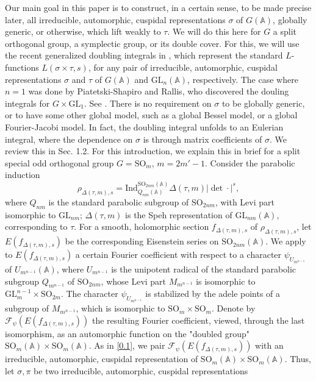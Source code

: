 \documentclass[12pts]{amsart}
\newcommand{\BA}{{\mathbb {A}}}
\newcommand{\GL}{{\mathrm{GL}}}
\newcommand{\Ind}{{\mathrm{Ind}}}
\newcommand{\SO}{{\mathrm{SO}}}
\begin{document}
Our main goal in this paper is to construct, in a certain sense, to be made precise later, all irreducible, automorphic, cuspidal representations $\sigma$ of $G(\BA)$, globally generic, or otherwise, which lift weakly to $\tau$. We will do this here for $G$ a split orthogonal group, a symplectic group, or its double cover. For this, we will use the recent generalized doubling integrals in \cite{CFGK17}, which represent the standard $L$-functions $L(\sigma\times\tau,s)$, for any pair of irreducible, automorphic, cuspidal representations $\sigma$ and $\tau$ of $G(\BA)$ and $\GL_n(\BA)$, respectively. The case where $n=1$ was done by Piatetski-Shapiro and Rallis, who discovered the douling integrals for $G\times \GL_1$. See \cite{PSR87}. There is no requirement on $\sigma$ to be globally generic, or to have some other global model, such as a global Bessel model, or a global Fourier-Jacobi model. In fact, the doubling integral unfolds to an Eulerian integral, where the dependence on $\sigma$ is through matrix coefficients of $\sigma$. We review this in Sec. 1.2. For this introduction, we explain this in brief for a split special odd orthogonal group  $G=\SO_m$, $m=2m'-1$. Consider the parabolic induction
$$
\rho_{\Delta(\tau,m),s}=\Ind_{Q_{nm}(\BA)}^{\SO_{2nm}(\BA)}\Delta(\tau,
m)|\det\cdot|^s,
$$		
where $Q_{nm}$ is the standard parabolic subgroup of $\SO_{2nm}$, with Levi part isomorphic to $\GL_{nm}$; $\Delta(\tau,m)$ is the Speh representation of $\GL_{nm}(\BA)$, corresponding to $\tau$. For a smooth, holomorphic section $f_{\Delta(\tau,m),s}$ of $\rho_{\Delta(\tau,m),s}$, let $E(f_{\Delta(\tau,m),s})$ be the corresponding Eisenstein series on $\SO_{2nm}(\BA)$. We apply to $E(f_{\Delta(\tau,m),s})$ a certain Fourier coefficient with respect to a character $\psi_{U_{m^{n-1}}}$ of $U_{m^{n-1}}(\BA)$, where $U_{m^{n-1}}$ is the unipotent radical of the standard parabolic subgroup $Q_{m^{n-1}}$ of 
 $\SO_{2nm}$, whose Levi part $M_{m^{n-1}}$ is isomorphic to $\GL_m^{n-1}\times \SO_{2m}$. The character $\psi_{U_{m^{n-1}}}$ is stabilized by the adele points of a subgroup of $M_{m^{n-1}}$, which is isomorphic to $\SO_m\times \SO_m$. Denote by $\mathcal{F}_\psi(E(f_{\Delta(\tau,m),s}))$ the resulting Fourier coefficient, viewed, through the last isomorphism, as an automorphic function on the "doubled group"  $\SO_m(\BA)\times \SO_m(\BA)$. As in \eqref{0.1}, we pair $\mathcal{F}_\psi(E(f_{\Delta(\tau,m),s}))$ with an irreducible, automorphic, cuspidal representation of $\SO_m(\BA)\times \SO_m(\BA)$. Thus, let
$\sigma,  \pi$ be two irreducible, automorphic, cuspidal representations
\end{document}
